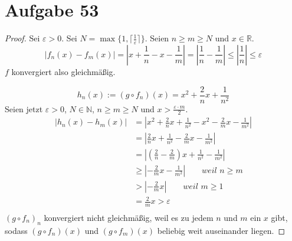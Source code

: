 \documentclass[10pt,a4paper]{article}
\begin{document}
\section*{Aufgabe 53}

\begin{proof}
Sei $\varepsilon > 0$.
Sei $N = \max \{ 1, \lceil \frac{1}{\varepsilon} \rceil \}$.
Seien $n \ge m \ge N$ und $x \in \mathbb{R}$.
\begin{equation}
|f_{n}(x) - f_{m}(x)| = |x + \frac{1}{n} - x - \frac{1}{m}| = |\frac{1}{n} - \frac{1}{m}| \le |\frac{1}{n}| \le \varepsilon
\end{equation}
$f$ konvergiert also gleichmäßig.

\begin{equation}
h_{n}(x) := (g \circ f_{n})(x) = x^{2} + \frac{2}{n}x + \frac{1}{n^{2}}
\end{equation}
Seien jetzt $\varepsilon > 0$, $N \in \mathbb{N}$, $n \ge m \ge N$ und $x > \frac{\varepsilon \cdot m}{2}$.
\begin{align*}
|h_{n}(x) - h_{m}(x)| & = |x^{2} + \frac{2}{n}x + \frac{1}{n^{2}} - x^{2} - \frac{2}{m}x - \frac{1}{m^{2}}|\\
& = |\frac{2}{n}x + \frac{1}{n^{2}} - \frac{2}{m}x - \frac{1}{m^{2}}|\\
& = |(\frac{2}{n} - \frac{2}{m})x + \frac{1}{n^{2}} - \frac{1}{m^{2}}|\\
& \ge |-\frac{2}{m}x - \frac{1}{m^{2}}| \qquad \textit{weil $n \ge m$}\\
& > |-\frac{2}{m}x| \qquad \textit{weil $m \ge 1$}\\
& = \frac{2}{m}x > \varepsilon\\
\end{align*}
$(g \circ f_{n})_{n}$ konvergiert nicht gleichmäßig, weil es zu jedem $n$ und $m$ ein $x$ gibt, sodass $(g \circ f_{n})(x)$ und $(g \circ f_{m})(x)$ beliebig weit auseinander liegen.
\end{proof}
\end{document}
